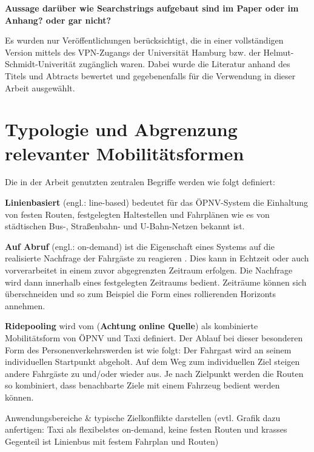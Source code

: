 \textbf{Aussage darüber wie Searchstrings aufgebaut sind im Paper oder im Anhang? oder gar nicht?}


Es wurden nur Veröffentlichungen berücksichtigt, die in einer vollständigen Version mittels des VPN-Zugangs der Universität Hamburg bzw. der Helmut-Schmidt-Univerität zugänglich waren. Dabei wurde die Literatur  anhand des Titels und Abtracts bewertet und gegebenenfalls  für die Verwendung in dieser Arbeit ausgewählt.

\section{Typologie und Abgrenzung relevanter Mobilitätsformen}
\label{sec:2.1}
\label{sec:Kontext}
Die in der Arbeit genutzten zentralen Begriffe werden wie folgt definiert:

\textbf{Linienbasiert} (engl.: line-based) bedeutet für das ÖPNV-System die Einhaltung von festen Routen, festgelegten Haltestellen und Fahrplänen wie es von städtischen Bus-, Straßenbahn- und U-Bahn-Netzen bekannt ist.

\textbf{Auf Abruf} (engl.: on-demand) ist die Eigenschaft eines Systems auf die realisierte Nachfrage der Fahrgäste zu reagieren \parencite[vgl.][S.3]{vansteenwegen_survey_2022}. Dies kann in Echtzeit oder auch vorverarbeitet in einem zuvor abgegrenzten Zeitraum erfolgen. Die Nachfrage wird dann innerhalb eines festgelegten Zeitraums bedient. Zeiträume können sich überschneiden und so zum Beispiel die Form eines rollierenden Horizonts annehmen.

\textbf{Ridepooling} wird vom \textcite[][]{verband_der_automobilindustrie_ridepooling_2025} (\textbf{Achtung online Quelle}) als kombinierte Mobilitätsform von ÖPNV und Taxi definiert. Der Ablauf bei dieser besonderen Form des Personenverkehrswerden ist wie folgt: Der Fahrgast wird an seinem individuellen Startpunkt abgeholt. Auf dem Weg zum individuellen Ziel steigen andere Fahrgäste zu und/oder wieder aus. Je nach Zielpunkt werden die Routen so kombiniert, dass benachbarte Ziele mit einem Fahrzeug bedient werden können.   

\vspace{5em}

Anwendungsbereiche \& typische Zielkonflikte darstellen (evtl. Grafik dazu anfertigen: Taxi als flexibelstes on-demand, keine festen Routen und krasses Gegenteil ist Linienbus mit festem Fahrplan und Routen)

